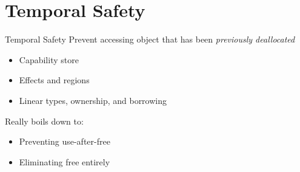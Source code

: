 \documentclass[aspectratio=169]{beamer}
\begin{document}

\section{Temporal Safety}

\begin{frame}[fragile]{Temporal Safety}
Prevent accessing object that has been \emph{previously deallocated}
\\
\begin{itemize}
   \item Capability store
   \item Effects and regions
   \item Linear types, ownership, and borrowing
\end{itemize}

Really boils down to:
\begin{itemize}
    \item Preventing use-after-free
    \item Eliminating free entirely 
\end{itemize}

\end{frame}
\end{document}
